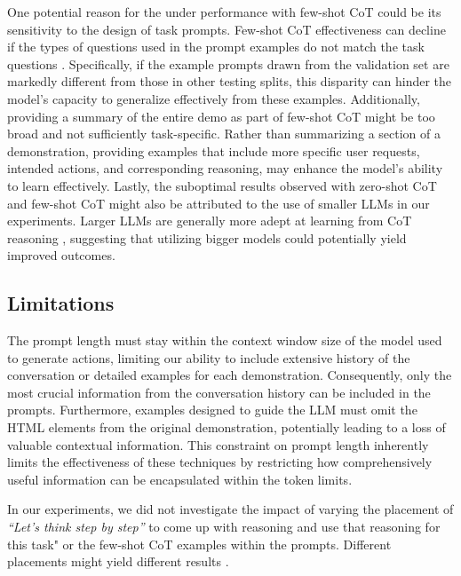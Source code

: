 \documentclass[11pt]{article}
\begin{document}
One potential reason for the under performance with few-shot CoT could be its sensitivity to the design of task prompts. Few-shot CoT effectiveness can decline if the types of questions used in the prompt examples do not match the task questions \cite{Large_Language_Models_Zero_Shot_Reasoners}. Specifically, if the example prompts drawn from the validation set are markedly different from those in other testing splits, this disparity can hinder the model's capacity to generalize effectively from these examples. Additionally, providing a summary of the entire demo as part of few-shot CoT might be too broad and not sufficiently task-specific. Rather than summarizing a section of a demonstration, providing examples that include more specific user requests, intended actions, and corresponding reasoning, may enhance the model's ability to learn effectively. Lastly, the suboptimal results observed with zero-shot CoT and few-shot CoT might also be attributed to the use of smaller LLMs in our experiments. Larger LLMs are generally more adept at learning from CoT reasoning \cite{wei_2023_larger_language_models_do_in_context_learning_differently}, suggesting that utilizing bigger models could potentially yield improved outcomes.

\subsection{Limitations}

The prompt length must stay within the context window size of the model used to generate actions, limiting our ability to include extensive history of the conversation or detailed examples for each demonstration. Consequently, only the most crucial information from the conversation history can be included in the prompts. Furthermore, examples designed to guide the LLM must omit the HTML elements from the original demonstration, potentially leading to a loss of valuable contextual information. This constraint on prompt length inherently limits the effectiveness of these techniques by restricting how comprehensively useful information can be encapsulated within the token limits.

In our experiments, we did not investigate the impact of varying the placement of \emph{“Let's think step by step”} to come up with reasoning and use that reasoning for this task" or the few-shot CoT examples within the prompts. Different placements might yield different results \cite{liu_2022_pretrain_systematic_survey_of_prompting_methods_natural_language_processing}. 
\end{document}

